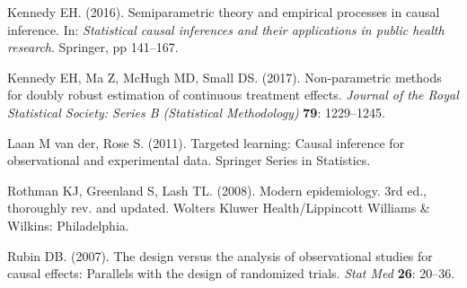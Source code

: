 \documentclass[
]{article}
\begin{document}
\leavevmode\hypertarget{ref-kennedy2016}{}%
Kennedy EH. (2016). Semiparametric theory and empirical processes in
causal inference. In: \emph{Statistical causal inferences and their
applications in public health research}. Springer, pp 141--167.

\leavevmode\hypertarget{ref-kennedy2017}{}%
Kennedy EH, Ma Z, McHugh MD, Small DS. (2017). Non-parametric methods
for doubly robust estimation of continuous treatment effects.
\emph{Journal of the Royal Statistical Society: Series B (Statistical
Methodology)} \textbf{79}: 1229--1245.

\leavevmode\hypertarget{ref-van2011}{}%
Laan M van der, Rose S. (2011). Targeted learning: Causal inference for
observational and experimental data. Springer Series in Statistics.

\leavevmode\hypertarget{ref-Rothman2008}{}%
Rothman KJ, Greenland S, Lash TL. (2008). Modern epidemiology. 3rd ed.,
thoroughly rev. and updated. Wolters Kluwer Health/Lippincott Williams
\& Wilkins: Philadelphia.

\leavevmode\hypertarget{ref-Rubin2007}{}%
Rubin DB. (2007). The design versus the analysis of observational
studies for causal effects: Parallels with the design of randomized
trials. \emph{Stat Med} \textbf{26}: 20--36.
\end{document}
